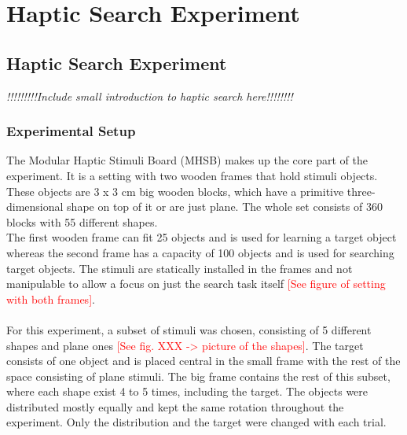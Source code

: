 
\chapter{Haptic Search Experiment} %

\label{Haptic Search Experiment} %


\section{Haptic Search Experiment}
\textit{!!!!!!!!!Include small introduction to haptic search here!!!!!!!!}

\subsection{Experimental Setup}
The Modular Haptic Stimuli Board (MHSB) makes up the core part of the experiment. It is a setting with two wooden frames that hold stimuli objects. These objects are 3 x 3 cm big wooden blocks, which have a primitive three-dimensional shape on top of it or are just plane. The whole set consists of 360 blocks with 55 different shapes.\\
The first wooden frame can fit 25 objects and is used for learning a target object whereas the second frame has a capacity of 100 objects and is used for searching target objects. The stimuli are statically installed in the frames and not manipulable to allow a focus on just the search task itself \textcolor{red}{[See figure of setting with both frames]}.\\
\\
For this experiment, a subset of stimuli was chosen, consisting of 5 different shapes and plane ones \textcolor{red}{[See fig. XXX -> picture of the shapes]}. The target consists of one object and is placed central in the small frame with the rest of the space consisting of plane stimuli. The big frame contains the rest of this subset, where each shape exist 4 to 5 times, including the target. The objects were distributed mostly equally and kept the same rotation throughout the experiment. Only the distribution and the target were changed with each trial.


